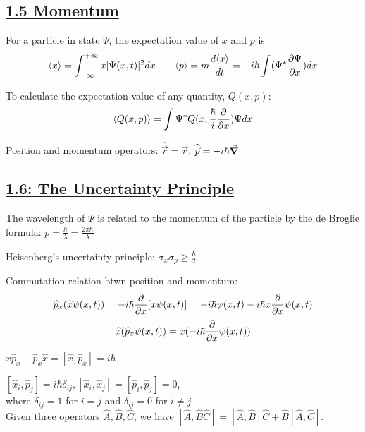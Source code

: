 \subsection{\underline{1.5 Momentum}}
For a particle in state $\Psi$, the expectation value of $x$ and $p$ is
    $$\langle x \rangle = \int_{-\infty}^{+\infty} x |\Psi(x, t)|^2 dx \qquad \langle p \rangle = m \frac{d \langle x \rangle}{dt} = -i \hbar \int (\Psi^* \pdv{\Psi}{x}) dx$$

To calculate the expectation value of any quantity, $Q(x, p)$:
$$\langle Q(x, p) \rangle = \int \Psi^* Q(x, \frac{\hbar}{i} \pdv{}{x}) \Psi dx$$

Position and momentum operators: $\widehat{\vec{r}} = \vec{r}$, $\widehat{\vec{p}} = -i \hbar \vec{\grad}$

\subsection{\underline{1.6: The Uncertainty Principle}}
The wavelength of $\Psi$ is related to the momentum of the particle by the de Broglie formula:
    $p = \frac{h}{\lambda} = \frac{2 \pi \hbar}{\lambda}$

Heisenberg's uncertainty principle: $\sigma_x \sigma_p \geq \frac{\hbar}{2}$

Commutation relation btwn position and momentum:
$$\widehat{p}_x (\widehat{x} \psi(x, t)) = -i \hbar \pdv{}{x} [x \psi(x, t)] = -i \hbar \psi(x, t) - i \hbar x \pdv{}{x} \psi(x, t)$$
    $$\widehat{x} (\widehat{p}_x \psi(x, t)) = x (-i \hbar \pdv{}{x} \psi(x, t))$$

    $\widehat{x} \widehat{p}_x - \widehat{p}_x \widehat{x} = [\widehat{x}, \widehat{p}_x] = i \hbar$

    $[\widehat{x}_i, \widehat{p}_j ] = i \hbar \delta_{ij}, [\widehat{x}_i, \widehat{x}_j] = [\widehat{p}_i, \widehat{p}_j] = 0$, \\ where $\delta_{ij} = 1$ for $i=j$ and $\delta_{ij} = 0$ for $i \neq j$ \\

Given three operators $\widehat{A}, \widehat{B}, \widehat{C}$, we have $[\widehat{A}, \widehat{B}\widehat{C}] = [\widehat{A}, \widehat{B}] \widehat{C} + \widehat{B} [\widehat{A}, \widehat{C}]$.



